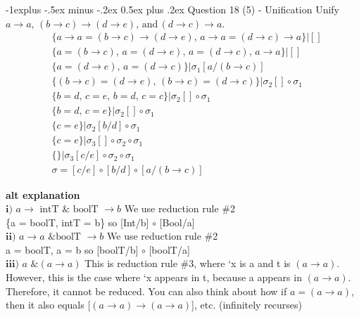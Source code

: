 \documentclass[letterpaper, 8pt]{extarticle}
\makeatletter
\renewcommand{\subsection}{\@startsection{subsection}{2}{0mm}%
                                {-1explus -.5ex minus -.2ex}%
                                {0.5ex plus .2ex}%
                                {\normalfont\small\bfseries}}
\newcommand{\ra}{\rightarrow}
\makeatother
\begin{document}
\begin{multicols*}{4}
    \subsection{Question 18 (5) - Unification}
    Unify $a \rightarrow a, \, (b \rightarrow c) \rightarrow (d \rightarrow e), \, \text{and} \,
        (d \rightarrow c) \rightarrow a$.
    \begin{align*}
         & \{a \ra a = (b \ra c) \ra (d \ra e), \, a \ra a = (d \ra c) \ra a \} | []         \\
         & \{a = (b \ra c), \, a = (d \ra e), \, a = (d \ra c), \, a \ra a \} | []           \\
         & \{a = (d \ra e), \, a = (d \ra c) \} | \sigma_1 [a / (b \ra c)]                   \\
         & \{(b \ra c) = (d \ra e), \, (b \ra c) = (d \ra c) \} | \sigma_2 [] \circ \sigma_1 \\
         & \{b = d, \, c = e, \, b = d, \, c = c \} | \sigma_2 [] \circ \sigma_1             \\
         & \{b = d, \, c = e \} | \sigma_2 [] \circ \sigma_1                                 \\
         & \{c = e \} | \sigma_2 [b / d] \circ \sigma_1                                      \\
         & \{c = e \} | \sigma_3 [] \circ \sigma_2 \circ \sigma_1                            \\
         & \{ \} | \sigma_3 [c / e] \circ \sigma_2 \circ \sigma_1                            \\
         & \sigma = [c / e] \circ [b / d] \circ  [a / (b \ra c)]
    \end{align*}

    \textbf{alt explanation} \\
    $\textbf{i)}$ $a \to \text{ intT } \& \text{ boolT } \to b$
    We use reduction rule \#2\\
    \{a = boolT, intT = b\}  so [Int/b] $\circ$ [Bool/a]\\
    $\textbf{ii)}$  $a \to  a \text{ \& boolT } \to  b$
    We use reduction rule \#2\\
    {a = boolT, a  = b}   so  [boolT/b] $\circ$ [boolT/a]\\
    $\textbf{iii)}$ $a \text{ \& } (a \to a)$
    This is reduction rule \#3, where ‘x is a and t is $(a \to a)$. However, this is the case where
    ‘x appears in t, because a appears in $(a \to a)$.
    Therefore, it cannot be reduced. You can also think about how if $a = (a \to a)$,
    then it also equals [$(a \to a) \to (a \to a)$], etc. (infinitely recurses)


\end{multicols*}
\end{document}
